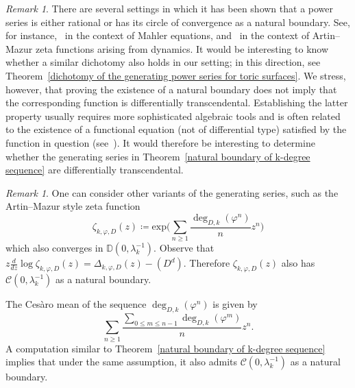 \documentclass[11pt,a4paper]{article}
\theoremstyle{plain}
\theoremstyle{remark}
\newtheorem{remark}[theorem]{Remark}
\theoremstyle{custombold}
\begin{document}
\begin{remark}\label{remark1}
There are several settings in which it has been shown that a power series is either rational or has its circle of convergence as a natural boundary. See, for instance,~\cite{Bell-Coons-Rowland-2013} in the context of Mahler equations, and~\cite{Nguyen-Bell-Gunn-Saunders-2023,Boudreau-Holmes-Nguyen-2025} in the context of Artin--Mazur zeta functions arising from dynamics. It would be interesting to know whether a similar dichotomy also holds in our setting; in this direction, see Theorem~\ref{dichotomy of the generating power series for toric surfaces}.
We stress, however, that proving the existence of a natural boundary does not imply that the corresponding function is differentially transcendental. Establishing the latter property usually requires more sophisticated algebraic tools and is often related to the existence of a functional equation (not of differential type) satisfied by the function in question (see~\cite{Adamczewski-Dreyfus-Hardouin-2021}). It would therefore be interesting to determine whether the generating series in Theorem~\ref{natural boundary of k-degree sequence} are differentially transcendental.
\end{remark}


\begin{remark}\label{Artin--Mazur style zeta function}
One can consider other variants of the generating series, such as the Artin--Mazur style zeta function $$\zeta_{k,\varphi,D}(z)\coloneqq \mathrm{exp}\Bigg(\sum_{n\geq1}\frac{\deg_{D,k}(\varphi^n)}{n}z^n\Bigg)$$ which also converges in $\mathbb{D}(0,\lambda_k^{-1})$. Observe that
$z\frac{d}{dz}\log \zeta_{k,\varphi,D}(z)=\Delta_{k,\varphi,D}(z)-(D^d)$. Therefore $\zeta_{k,\varphi,D}(z)$ also has $\mathcal C(0,\lambda_k^{-1})$ as a natural boundary.

The Ces\`aro mean of the sequence $\deg_{D,k}(\varphi^n)$ is given by 
	$$\sum_{n\geq1}\frac{\sum_{0\leq m\leq n-1}\deg_{D,k}(\varphi^m)}{n}z^n.$$
	A computation similar to Theorem~\ref{natural boundary of k-degree sequence} implies that under the same assumption, it also admits $\mathcal C(0,\lambda_k^{-1})$ as a natural boundary.
\end{remark}
\end{document}
